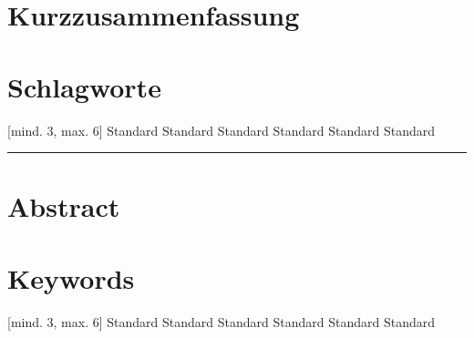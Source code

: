 \section*{Kurzzusammenfassung}

\lipsum[1] %

\section*{Schlagworte}
[mind. 3, max. 6] Standard Standard Standard Standard Standard Standard

\vspace{0.5cm}
\hrule
\vspace{0.5cm}

\section*{Abstract}

\lipsum[1] %

\section*{Keywords}
[mind. 3, max. 6] Standard Standard Standard Standard Standard Standard
